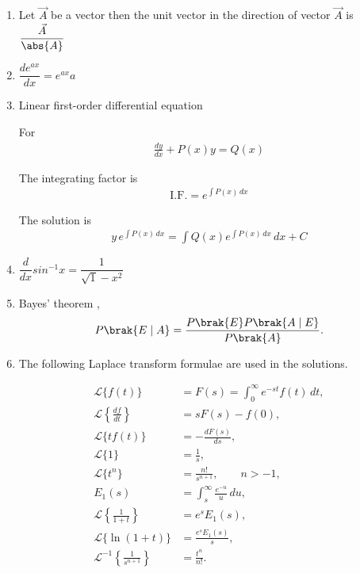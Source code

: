\begin{enumerate}[label=\thesubsection.\arabic*, ref=\thesubsection.\theenumi]
\item
Let $\vec{A}$ be a vector then the unit vector in the direction of vector $\vec{A}$
is $\dfrac{\vec{A}}{\abs{A}}$\label{eq:EE26BTECH11211_Prob_12.1}

\item
$\dfrac{de^{ax}}{dx} = e^{ax}a$ \label{eq:EE26BTECH11211_Prob_13}

\item 
Linear first-order differential equation \label{eq:EE26BTECH11211_Prob_14}

For
\begin{align}
    \frac{dy}{dx}+P(x)y=Q(x)
\end{align}

The integrating factor is
\begin{align}
    \mathrm{I.F.}=e^{\int P(x)\,dx}
\end{align}

The solution is
\begin{align}
    y\,e^{\int P(x)\,dx}
    =\int Q(x)e^{\int P(x)\,dx}\,dx+C
\end{align}

\item
$\dfrac{d}{dx}sin^{-1}x = \dfrac{1}{\sqrt1-x^2}$\label{eq:EE26BTECH11211_Prob_15}

\item
 Bayes' theorem ,
\begin{align}
P\brak{E\mid A}
=\frac{P\brak{E}P\brak{A\mid E}}{P\brak{A}}\label{eq:EE26BTECH11211-Prob_16}.
\end{align}

\item
The following Laplace transform formulae are used in the solutions.

\begin{align}
\mathcal{L}\{f(t)\}
&=F(s)=\int_0^\infty e^{-st}f(t)\,dt,
\label{eq:EE26BTECH11211_Prob_1.1.17.1}
\\
\mathcal{L}\left\{\frac{df}{dt}\right\}
&=sF(s)-f(0),
\label{eq:EE26BTECH11211_Prob_1.1.17.2}
\\
\mathcal{L}\{t f(t)\}
&=-\frac{dF(s)}{ds},
\label{eq:EE26BTECH11211_Prob_1.1.17.3}
\\
\mathcal{L}\{1\}
&=\frac{1}{s},
\label{eq:laplace-one}
\\
\mathcal{L}\{t^n\}
&=\frac{n!}{s^{n+1}},\qquad n>-1,
\label{eq:EE26BTECH11211_Prob_1.1.17.5}
\\
E_1(s)&=\int_s^\infty \frac{e^{-u}}{u}\,du,
\label{eq:exponential-integral}
\\
\mathcal{L}\left\{\frac{1}{1+t}\right\}
&=e^sE_1(s),
\label{eq:EE26BTECH11211_Prob_1.1.17.7}
\\
\mathcal{L}\{\ln(1+t)\}
&=\frac{e^sE_1(s)}{s},
\label{eq:EE26BTECH11211_Prob_1.1.17.8}
\\
\mathcal{L}^{-1}\left\{\frac{1}{s^{n+1}}\right\}
&=\frac{t^n}{n!}.
\label{eq:EE26BTECH11211_Prob_1.1.17.9}
\end{align}
\end{enumerate}

